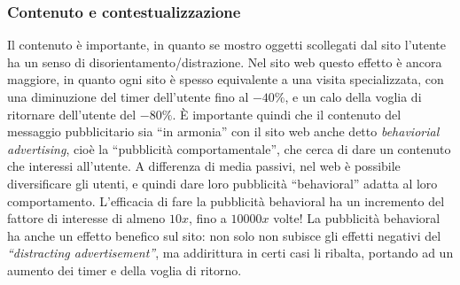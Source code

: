 \subsubsection{Contenuto e contestualizzazione}Il contenuto \`e importante, in quanto se mostro oggetti scollegati dal sito l'utente ha un senso di disorientamento/distrazione. Nel sito web questo effetto \`e ancora maggiore, in quanto ogni sito \`e spesso equivalente a una visita specializzata, con una diminuzione del timer dell'utente fino al $-40\%$, e un calo della voglia di ritornare dell'utente del $-80\%$. \`E importante quindi che il contenuto del messaggio pubblicitario sia ``in armonia'' con il sito web anche detto \textit{behaviorial advertising}, cio\`e la ``pubblicit\`a comportamentale'', che cerca di dare un contenuto che interessi all'utente. A differenza di media passivi, nel web \`e possibile diversificare gli utenti, e quindi dare loro pubblicit\`a ``behavioral'' adatta al loro comportamento. L'efficacia di fare la pubblicit\`a behavioral ha un incremento del fattore di interesse di almeno $10x$, fino a $10000x$ volte! La pubblicit\`a behavioral ha anche un effetto benefico sul sito: non solo non subisce gli effetti negativi del \textit{``distracting advertisement''}, ma addirittura in certi casi li ribalta, portando ad un aumento dei timer e della voglia di ritorno.

